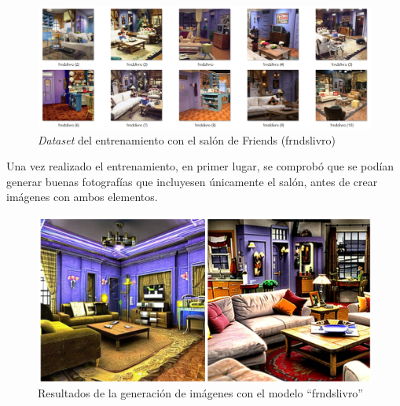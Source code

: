 \begin{figure}[!htb]
	\centering
	\includegraphics[width = 1
	\textwidth]{Imagenes/Vectorial/dataset_frdslivro.png}
	\caption{\textit{Dataset} del entrenamiento con el salón de Friends (frndslivro)}
	\label{fig:dataset_frdslivro}
\end{figure}


Una vez realizado el entrenamiento, en primer lugar, se comprobó que se podían generar buenas fotografías que incluyesen únicamente el salón, antes de crear imágenes con ambos elementos.\\

\begin{figure}[!htb]
	\centering
	\includegraphics[width = 1
	\textwidth]{Imagenes/Vectorial/resultadosfrndslivro.png}
	\caption{Resultados de la generación de imágenes con el modelo ``frndslivro''}
	\label{fig:resultsfrnds}
\end{figure}


